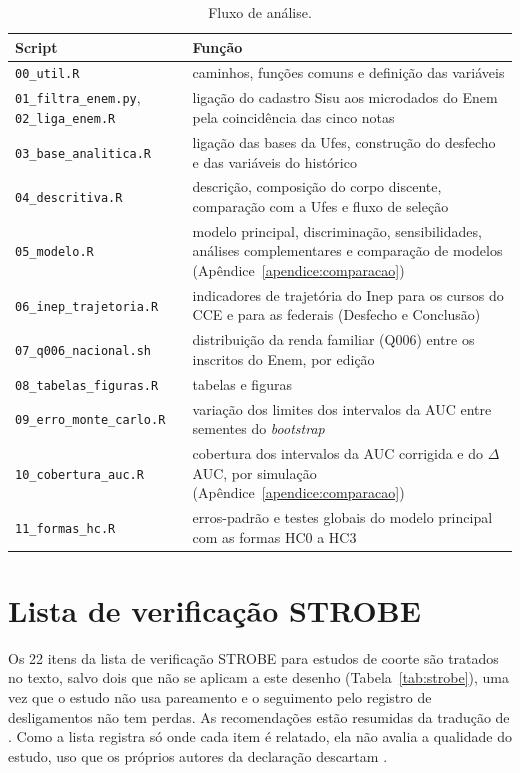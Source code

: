 \documentclass[12pt,a4paper]{article}
\begin{document}
\begin{table}[H]
  \centering
  \caption[Fluxo de análise]{Fluxo de análise.}
  \label{tab:scripts}
  \begin{tabular}{>{\raggedright\arraybackslash}p{5.0cm} >{\raggedright\arraybackslash}p{9.5cm}}
    \toprule
    Script & Função \\
    \midrule
    \texttt{00\_util.R} & caminhos, funções comuns e definição das variáveis \\
    \texttt{01\_filtra\_enem.py}, \texttt{02\_liga\_enem.R} & ligação do cadastro Sisu aos microdados do Enem pela coincidência das cinco notas \\
    \texttt{03\_base\_analitica.R} & ligação das bases da Ufes, construção do desfecho e das variáveis do histórico \\
    \texttt{04\_descritiva.R} & descrição, composição do corpo discente, comparação com a Ufes e fluxo de seleção \\
    \texttt{05\_modelo.R} & modelo principal, discriminação, sensibilidades, análises complementares e comparação de modelos (Apêndice~\ref{apendice:comparacao}) \\
    \texttt{06\_inep\_trajetoria.R} & indicadores de trajetória do Inep para os cursos do CCE e para as federais (Desfecho e Conclusão) \\
    \texttt{07\_q006\_nacional.sh} & distribuição da renda familiar (Q006) entre os inscritos do Enem, por edição \\
    \texttt{08\_tabelas\_figuras.R} & tabelas e figuras \\
    \texttt{09\_erro\_monte\_carlo.R} & variação dos limites dos intervalos da AUC entre sementes do \textit{bootstrap} \\
    \texttt{10\_cobertura\_auc.R} & cobertura dos intervalos da AUC corrigida e do $\Delta$AUC, por simulação (Apêndice~\ref{apendice:comparacao}) \\
    \texttt{11\_formas\_hc.R} & erros-padrão e testes globais do modelo principal com as formas HC0 a HC3 \\
    \bottomrule
  \end{tabular}
\end{table}


\section{Lista de verificação STROBE}
\label{apendice:strobe}

Os 22 itens da lista de verificação STROBE para estudos de coorte são tratados no texto, salvo dois que não se aplicam a este desenho (Tabela~\ref{tab:strobe}), uma vez que o estudo não usa pareamento e o seguimento pelo registro de desligamentos não tem perdas. As recomendações estão resumidas da tradução de \citet{malta2010strobe}. Como a lista registra só onde cada item é relatado, ela não avalia a qualidade do estudo, uso que os próprios autores da declaração descartam \citep{vonelm2007strobe}.
\end{document}
